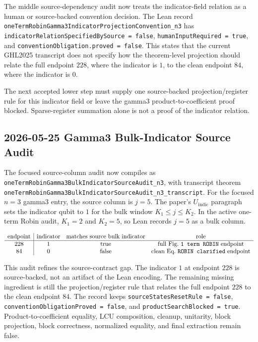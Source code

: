 The middle source-dependency audit now treats the indicator-field relation as a
human or source-backed convention decision.  The Lean record
\texttt{oneTermRobinGamma3IndicatorProjectionConvention\_n3} has
\texttt{indicatorRelationSpecifiedBySource = false},
\texttt{humanInputRequired = true}, and
\texttt{conventionObligation.proved = false}.  This states that the current
GHL2025 transcript does not specify how the theorem-level projection should
relate the full endpoint \(228\), where the indicator is \(1\), to the clean
endpoint \(84\), where the indicator is \(0\).

The next accepted lower step must supply one source-backed projection/register
rule for this indicator field or leave the gamma3 product-to-coefficient proof
blocked.  Sparse-register summation alone is not a proof of the indicator
relation.

\subsection{2026-05-25 Gamma3 Bulk-Indicator Source Audit}

The focused source-column audit now compiles as
\texttt{oneTermRobinGamma3BulkIndicatorSourceAudit\_n3}, with transcript
theorem
\texttt{oneTermRobinGamma3BulkIndicatorSourceAudit\_n3\_transcript}.  For the
focused \(n=3\) gamma3 entry, the source column is \(j=5\).  The paper's
\(U_{\mathrm{indic}}\) paragraph sets the indicator qubit to \(1\) for the
bulk window \(K_1 \leq j \leq K_2\).  In the active one-term Robin audit,
\(K_1=2\) and \(K_2=5\), so Lean records \(j=5\) as a bulk column.

\[
\begin{array}{c|ccc}
\text{endpoint} & \text{indicator} & \text{matches source bulk indicator} & \text{role} \\
\hline
228 & 1 & \text{true} & \text{full Fig.~\texttt{1 term ROBIN} endpoint} \\
84 & 0 & \text{false} & \text{clean Eq.~\texttt{ROBIN clarified} endpoint}
\end{array}
\]

This audit refines the source-contract gap.  The indicator \(1\) at endpoint
\(228\) is source-backed, not an artifact of the Lean encoding.  The remaining
missing ingredient is still the projection/register rule that relates the full
endpoint \(228\) to the clean endpoint \(84\).  The record keeps
\texttt{sourceStatesResetRule = false},
\texttt{conventionObligationProved = false}, and
\texttt{productSearchBlocked = true}.  Product-to-coefficient equality, LCU
composition, cleanup, unitarity, block projection, block correctness,
normalized equality, and final extraction remain false.

